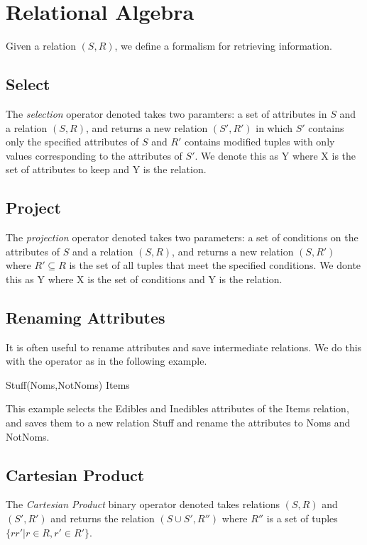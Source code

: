 \chapter{Relational Algebra}

Given a relation $(S,R)$, we define a formalism for retrieving
information.

\section{Select}

The \emph{selection} operator denoted \Select{} takes two paramters: a
set of attributes in $S$ and a relation $(S,R)$, and returns a new
relation $(S',R')$ in which $S'$ contains only the specified
attributes of $S$ and $R'$ contains modified tuples with only values
corresponding to the attributes of $S'$.  We denote this as
Y where X is the set of attributes to keep and Y is the
relation.

\section{Project}

The \emph{projection} operator denoted \Project{} takes two
parameters: a set of conditions on the attributes of $S$ and a
relation $(S,R)$, and returns a new relation $(S,R')$ where $R'
\subseteq R$ is the set of all tuples that meet the specified
conditions.  We donte this as Y where X is the set of
conditions and Y is the relation.

\section{Renaming Attributes}

It is often useful to rename attributes and save intermediate
relations.  We do this with the \GoesTo operator as in the following
example.

Stuff(Noms,NotNoms) \GoesTo {} Items

This example selects the Edibles and Inedibles attributes of the Items
relation, and saves them to a new relation Stuff and rename the
attributes to Noms and NotNoms.

\section{Cartesian Product}

The \emph{Cartesian Product} binary operator denoted \CartesianProduct
takes relations $(S,R)$ and $(S',R')$ and returns the relation $(S
\cup S',R'')$ where $R''$ is a set of tuples $\{r r' | r \in R, r' \in
R' \}$.

